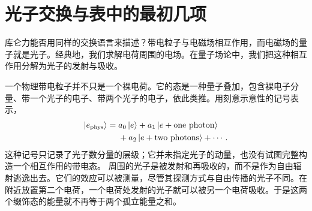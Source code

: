 \begin{classroomqa}
\end{classroomqa}

\begin{classroomqa}
\end{classroomqa}

\begin{classroomqa}
\end{classroomqa}

\begin{classroomqa}
\end{classroomqa}

\section{光子交换与表中的最初几项}

库仑力能否用同样的交换语言来描述？带电粒子与电磁场相互作用，而电磁场的量子就是光子。经典地，我们求解电荷周围的电场。在量子场论中，我们把这种相互作用分解为光子的发射与吸收。

一个物理带电粒子并不只是一个裸电荷。它的态是一种量子叠加，包含裸电子分量、带一个光子的电子、带两个光子的电子，依此类推。用刻意示意性的记号表示，
\begin{equation}
\begin{aligned}
\left\lvert e_{\mathrm{phys}}\right\rangle
={}&a_0\left\lvert e\right\rangle
+a_1\left\lvert e+\text{one photon}\right\rangle
\\
&+a_2\left\lvert e+\text{two photons}\right\rangle+\cdots .
\end{aligned}
\end{equation}
这种记号只记录了光子数分量的层级；它并未指定光子的动量，也没有试图完整构造一个相互作用的带电态。
周围的光子是被发射和再吸收的，而不是作为自由辐射逃逸出去。它们的效应可以被测量，尽管其探测方式与自由传播的光子不同。在附近放置第二个电荷，一个电荷处发射的光子就可以被另一个电荷吸收。于是这两个缀饰态的能量就不再等于两个孤立能量之和。

